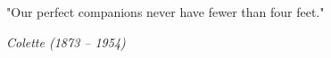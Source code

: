 
\begin{dedication} 

"Our perfect companions never have fewer than four feet."

\emph{Colette (1873 -- 1954)}

\end{dedication}


